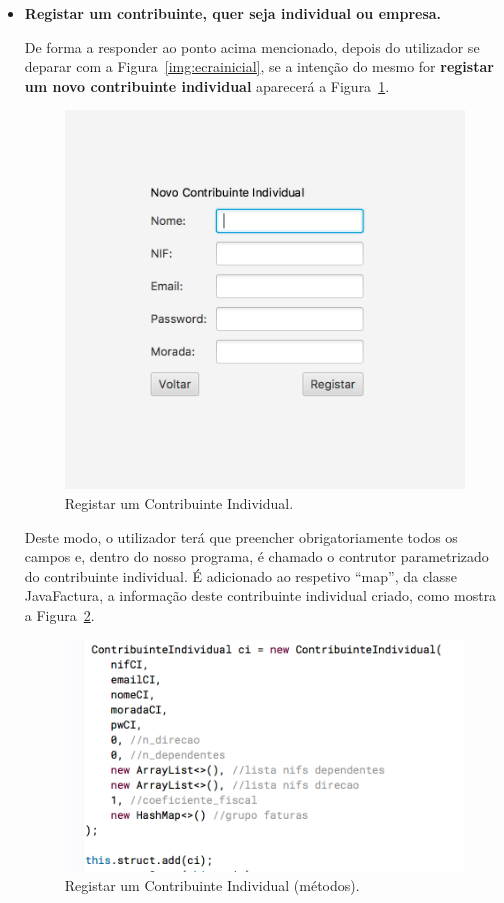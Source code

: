 \documentclass[a4paper]{article}
\begin{document}
\begin{itemize}

\item \textbf{Registar um contribuinte, quer seja individual ou empresa.}

De forma a responder ao ponto acima mencionado, depois do utilizador se deparar
com a Figura~\ref{img:ecrainicial}, se a intenção do mesmo for \textbf{registar um novo
contribuinte individual} aparecerá a Figura~\ref{img:criarci}.

\begin{figure}[H]
\centering
\includegraphics[scale=0.40]{imgs/criarci.png}
\caption{Registar um Contribuinte Individual.}
\label{img:criarci}
\end{figure}

Deste modo, o utilizador terá que preencher obrigatoriamente todos os campos e,
dentro do nosso programa, é chamado o contrutor parametrizado do contribuinte individual.
É adicionado ao respetivo ``map'', da classe \textsf{JavaFactura}, a informação
deste contribuinte individual criado, como mostra a Figura~\ref{img:criarci_func}.

\begin{figure}[H]
\centering
\includegraphics[scale=0.40]{imgs/criarci_func.png}
\caption{Registar um Contribuinte Individual (métodos).}
\label{img:criarci_func}
\end{figure}


\end{itemize}
\end{document}
